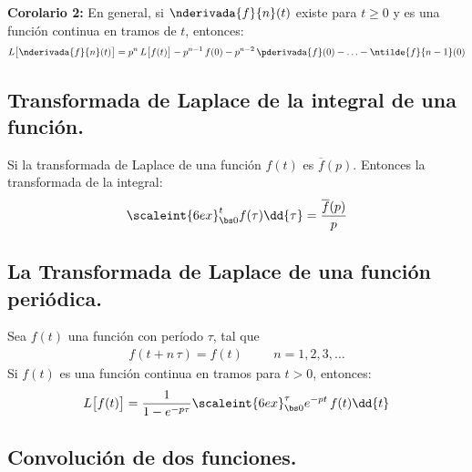 \noindent \textbf{Corolario 2:} En general, si $\nderivada{f}{n} (t)$ existe para $t \geq 0$ y es una función continua en tramos de $t$, entonces:
\begin{align}
L \big[  \nderivada{f}{n} (t)  \big] = p^{n} \, L \big[  f (t)  \big] - p^{n-1} \, f (0) - p^{n-2} \, \pderivada{f}(0) - \ldots - \ntilde{f}{n-1} (0)
\label{eq:ecuacion_03_13}
\end{align}

\subsection{Transformada de Laplace de la integral de una función.}

Si la transformada de Laplace de una función $f (t)$ es $\overline{f} (p)$. Entonces la transformada de la integral:
\begin{align}
\scaleint{6ex}_{\bs 0}^{t} f (\tau) \dd{\tau} = \dfrac{\overline{f} (p)}{p}
\label{eq:ecuacion_03_16}
\end{align}

\subsection{La Transformada de Laplace de una función periódica.}

Sea $f (t)$ una función con período $\tau$, tal que 
\begin{align*}
f (t + n \, \tau) = f (t) \hspace{1cm} n = 1, 2, 3, \ldots
\end{align*}
Si $f (t)$ es una función continua en tramos para $t > 0$, entonces:
\begin{align}
L \big[  f (t)  \big] = \dfrac{1}{1 - e^{-p \tau}} \scaleint{6ex}_{\bs 0}^{\tau} e^{-p t} \, f (t) \dd{t}
\end{align}

\subsection{Convolución de dos funciones.}

